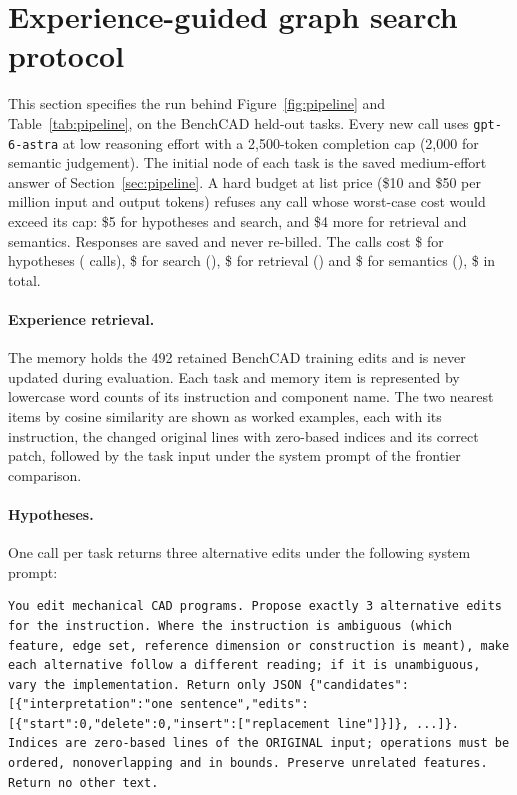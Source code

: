 \clearpage
\appendix
\section{Experience-guided graph search protocol}
\label{sec:pipeline-protocol}
This section specifies the run behind Figure~\ref{fig:pipeline} and Table~\ref{tab:pipeline}, on the \pipeN{} BenchCAD held-out tasks. Every new call uses \texttt{gpt-6-astra} at low reasoning effort with a 2,500-token completion cap (2,000 for semantic judgement). The initial node of each task is the saved medium-effort answer of Section~\ref{sec:pipeline}. A hard budget at list price (\$10 and \$50 per million input and output tokens) refuses any call whose worst-case cost would exceed its cap: \$5 for hypotheses and search, and \$4 more for retrieval and semantics. Responses are saved and never re-billed. The calls cost \$\pipeBranchCost{} for hypotheses (\pipeBranchCalls{} calls), \$\pipeMctsCost{} for search (\pipeMctsCalls), \$\pipeRagCost{} for retrieval (\pipeRagCalls) and \$\pipeSemanticCost{} for semantics (\pipeSemanticCalls), \$\pipeCost{} in total.

\paragraph{Experience retrieval.}
The memory holds the 492 retained BenchCAD training edits and is never updated during evaluation. Each task and memory item is represented by lowercase word counts of its instruction and component name. The two nearest items by cosine similarity are shown as worked examples, each with its instruction, the changed original lines with zero-based indices and its correct patch, followed by the task input under the system prompt of the frontier comparison.

\paragraph{Hypotheses.}
One call per task returns three alternative edits under the following system prompt:
\begin{lstlisting}
You edit mechanical CAD programs. Propose exactly 3 alternative edits for the instruction. Where the instruction is ambiguous (which feature, edge set, reference dimension or construction is meant), make each alternative follow a different reading; if it is unambiguous, vary the implementation. Return only JSON {"candidates":[{"interpretation":"one sentence","edits":[{"start":0,"delete":0,"insert":["replacement line"]}]}, ...]}. Indices are zero-based lines of the ORIGINAL input; operations must be ordered, nonoverlapping and in bounds. Preserve unrelated features. Return no other text.
\end{lstlisting}

